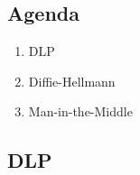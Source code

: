 

\subsection*{Agenda}
\begin{enumerate}
\item DLP
\item Diffie-Hellmann
\item Man-in-the-Middle
\end{enumerate}
\subsection{DLP}

